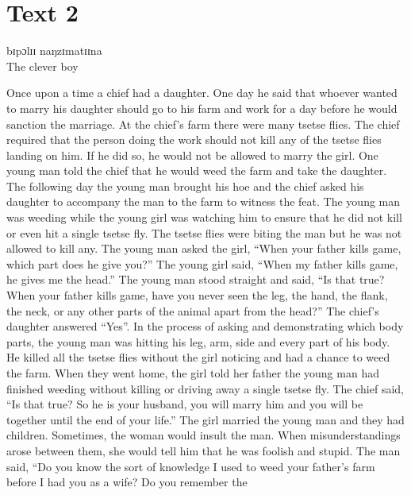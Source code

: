 \cleardoublepage


\section*{Text 2}
\label{chap:TXT-text-2}

\vspace*{30pt}
\begin{center}
 {\Large bɪpɔlɪɪ naŋzɪmatɪɪna}\\
 {\large The clever boy}\\
\end{center}


 Once upon a time a chief had a daughter. One day he said that whoever
wanted to marry his daughter should go to his farm and work for a day before
he would sanction the marriage. At the chief’s farm there were many tsetse
ﬂies. The chief required that the person doing the work should not kill any of
the tsetse ﬂies landing on him. If he did so, he would not be allowed to marry
the girl. One young man told the chief that he would weed the farm and
take the daughter. The following day the young man brought his hoe and
the chief asked his daughter to accompany the man to the farm to witness the
feat. The young man was weeding while the young girl was
watching him to ensure that he did not kill or even hit a single tsetse ﬂy.
The tsetse ﬂies were biting the man but he was not allowed to kill any. The
young
man asked the girl, “When your father kills game, which part does he give
you?” The young girl said, “When my father kills game, he gives me the
head.” The young man stood straight and said, “Is that true? When your
father kills game, have you never seen the leg, the hand, the ﬂank, the neck,
or any other parts of the animal apart from the head?” The chief’s daughter
answered “Yes”. In the process of asking and demonstrating which body parts, the
young man
was hitting his leg, arm, side and every part of his body. He killed all the
tsetse ﬂies  without the girl noticing and had a chance to weed the farm.
When they went home, the girl told her father the young man had finished weeding
without killing or driving away a single tsetse ﬂy. The chief said,
“Is that true? So he is your husband, you will marry him and you will be
together until the end of your life.”  The girl married the young man and
they had children. Sometimes, the woman would insult the man. When
misunderstandings arose between them, she would tell him that he was foolish
and stupid. The man said, “Do you know the sort of knowledge I used to
weed your father’s farm before I had you as a wife? Do you remember the
